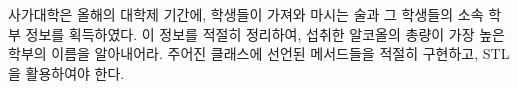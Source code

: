 사가대학은 올해의 대학제 기간에, 학생들이 가져와 마시는 술과 그 학생들의 소속 학부 정보를 획득하였다. 이 정보를 적절히 정리하여, 섭취한 알코올의 총량이 가장 높은 학부의 이름을 알아내어라. 주어진 클래스에 선언된 메서드들을 적절히 구현하고, STL을 활용하여야 한다.